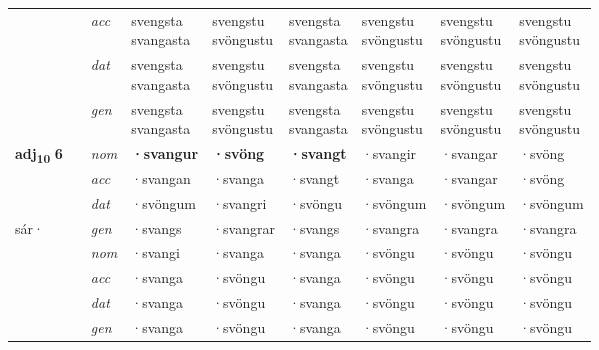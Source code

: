 \begin{longtable}{l>{\footnotesize\itshape}l>{\footnotesize\itshape}lXXXXXX}
 & & acc & \specialcell{svengsta\\ svangasta} & \specialcell{svengstu\\ svöngustu} & \specialcell{svengsta\\ svangasta} & \specialcell{svengstu\\ svöngustu} & \specialcell{svengstu\\ svöngustu} & \specialcell{svengstu\\ svöngustu} \\*
 & & dat & \specialcell{svengsta\\ svangasta} & \specialcell{svengstu\\ svöngustu} & \specialcell{svengsta\\ svangasta} & \specialcell{svengstu\\ svöngustu} & \specialcell{svengstu\\ svöngustu} & \specialcell{svengstu\\ svöngustu} \\*
 & & gen & \specialcell{svengsta\\ svangasta} & \specialcell{svengstu\\ svöngustu} & \specialcell{svengsta\\ svangasta} & \specialcell{svengstu\\ svöngustu} & \specialcell{svengstu\\ svöngustu} & \specialcell{svengstu\\ svöngustu} \\
\cmidrule{1-9}



\multirow{3}{*}{{{\textbf{adj{\textsubscript{10}}} \Large{\textbf{6}}}}} & \multirow{4}{*}{\begin{turn}{90}\textit{pos s}\end{turn}} & nom & \textbf{·svangur} & \textbf{·svöng} & \textbf{·svangt} & ·svangir & ·svangar & ·svöng \\*
 & & acc & ·svangan & ·svanga & ·svangt & ·svanga & ·svangar & ·svöng \\*
 & & dat & ·svöngum & ·svangri & ·svöngu & ·svöngum & ·svöngum & ·svöngum \\*
 \multirow{5}{*}{sár\allowbreak ·} & & gen & ·svangs & ·svangrar & ·svangs & ·svangra & ·svangra & ·svangra \\
\cmidrule{2-9}
& \multirow{4}{*}{\begin{turn}{90}\textit{pos w}\end{turn}} & nom & ·svangi & ·svanga & ·svanga & ·svöngu & ·svöngu & ·svöngu \\*
 & &  acc & ·svanga & ·svöngu & ·svanga & ·svöngu & ·svöngu & ·svöngu \\*
 & & dat & ·svanga & ·svöngu & ·svanga & ·svöngu & ·svöngu & ·svöngu \\*
 & & gen & ·svanga & ·svöngu & ·svanga & ·svöngu & ·svöngu & ·svöngu \\
\cmidrule{1-9}




\end{longtable}
